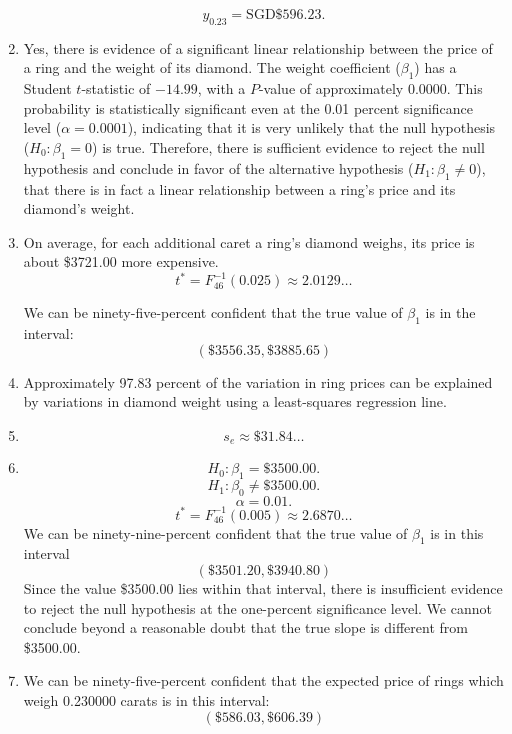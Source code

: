 \documentclass[12pt]{article}
\begin{document}
\begin{enumerate}
\[y_{0.23}=\text{SGD}\$596.23.\]
\item Yes, there is evidence of a significant linear relationship between the price of a ring and the weight of its diamond. The weight coefficient ($\beta_1$) has a Student $t$-statistic of $-14.99$, with a $P$-value of approximately 0.0000. This probability is statistically significant even at the 0.01 percent significance level ($\alpha=0.0001$), indicating that it is very unlikely that the null hypothesis ($H_0:\beta_1=0$) is true. Therefore, there is sufficient evidence to reject the null hypothesis and conclude in favor of the alternative hypothesis ($H_1:\beta_1\neq 0$), that there is in fact a linear relationship between a ring's price and its diamond's weight.
\item On average, for each additional caret a ring's diamond weighs, its price is about \$3721.00 more expensive.
\[t^*=F^{-1}_{46}(0.025)\approx 2.0129\dots\]

We can be ninety-five-percent confident that the true value of $\beta_1$ is in the interval:
\[(\$3556.35,\$3885.65)\]
\item Approximately 97.83 percent of the variation in ring prices can be explained by variations in diamond weight using a least-squares regression line.
\item\[s_e\approx\$31.84\dots\]
\item\[H_0:\beta_1=\$3500.00.\]
\[H_1:\beta_0\neq\$3500.00.\]
\[\alpha=0.01.\]
\[t^*=F^{-1}_{46}(0.005)\approx 2.6870\dots\]
We can be ninety-nine-percent confident that the true value of $\beta_1$ is in this interval
\[(\$3501.20,\$3940.80)\]
Since the value \$3500.00 lies within that interval, there is insufficient evidence to reject the null hypothesis at the one-percent significance level. We cannot conclude beyond a reasonable doubt that the true slope is different from \$3500.00.
\item We can be ninety-five-percent confident that the expected price of rings which weigh 0.230000 carats is in this interval:
\[(\$586.03,\$606.39)\]
\end{enumerate}
\end{document}

